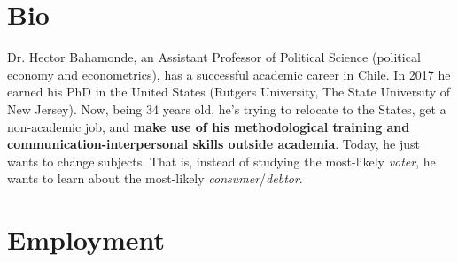 \documentclass[letterpaper]{article}
\begin{document}
\section*{Bio}


Dr. Hector Bahamonde, an Assistant Professor of Political Science (political economy and econometrics), has a successful academic career in Chile. In 2017 he earned his PhD in the United States (Rutgers University, The State University of New Jersey). Now, being 34 years old, he's trying to relocate to the States, get a non-academic job, and {\bf make use of his methodological training and communication-interpersonal skills outside academia}. Today, he just wants to change subjects. That is, instead of studying the most-likely \emph{voter}, he wants to learn about the most-likely \emph{consumer}/\emph{debtor}. 

{\unskip}

\section*{Employment}

{\unskip}



\end{document}
